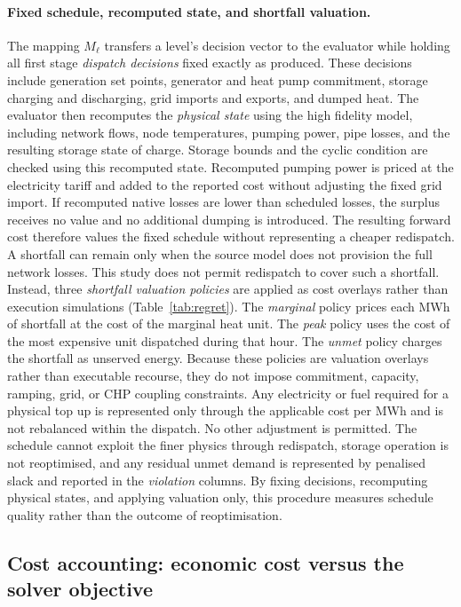 \documentclass[a4paper,fleqn]{cas-sc}
\begin{document}
\paragraph{Fixed schedule, recomputed state, and shortfall valuation.}
The mapping $M_\ell$ transfers a level's decision vector to 
the evaluator while holding all first stage \emph{dispatch decisions} 
fixed exactly as produced. These decisions include generation set points, 
generator and heat pump commitment, storage charging and discharging, grid imports and exports, 
and dumped heat. The evaluator then recomputes the \emph{physical state} using the high fidelity 
model, including network flows, node temperatures, pumping power, pipe losses, and the resulting 
storage state of charge. Storage bounds and the cyclic condition are checked using this recomputed 
state. Recomputed pumping power is priced at the electricity tariff and added to the reported cost 
without adjusting the fixed grid import. If recomputed native losses are lower than scheduled losses,
 the surplus receives no value and no additional dumping is introduced. The resulting forward cost 
 therefore values the fixed schedule without representing a cheaper redispatch. A shortfall can 
 remain only when the source model does not provision the full network losses. This study does 
 not permit redispatch to cover such a shortfall. Instead, three \emph{shortfall valuation policies}
  are applied as cost overlays rather than execution simulations (Table~\ref{tab:regret}). 
  The \emph{marginal} policy prices each MWh of shortfall at the cost of the marginal heat unit. 
  The \emph{peak} policy uses the cost of the most expensive unit dispatched during that hour. 
  The \emph{unmet} policy charges the shortfall as unserved energy. 
  Because these policies are valuation overlays rather than executable recourse, 
  they do not impose commitment, capacity, ramping, grid, or CHP coupling constraints. 
  Any electricity or fuel required for a physical top up is represented only through the 
  applicable cost per MWh and is not rebalanced within the dispatch. No other adjustment 
  is permitted. The schedule cannot exploit the finer physics through redispatch, storage 
  operation is not reoptimised, and any residual unmet demand is represented by penalised 
  slack and reported in the \emph{violation} columns. By fixing decisions, recomputing 
  physical states, and applying valuation only, this procedure measures schedule quality 
  rather than the outcome of reoptimisation.

\subsection{Cost accounting: economic cost versus the solver objective}
\label{subsec:costacct}
\end{document}
